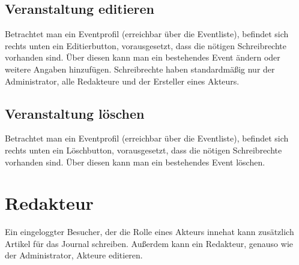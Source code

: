 \documentclass{swp}
\begin{document}
\subsection{Veranstaltung editieren}
Betrachtet man ein Eventprofil (erreichbar über die Eventliste), befindet sich rechts unten ein Editierbutton, vorausgesetzt, dass die n\"otigen Schreibrechte vorhanden sind. \"Uber diesen kann man ein bestehendes Event \"andern oder weitere Angaben hinzuf\"ugen.
Schreibrechte haben standardm\"a{\ss}ig nur der Administrator, alle Redakteure und der Ersteller eines Akteurs.
\subsection{Veranstaltung l\"oschen}
Betrachtet man ein Eventprofil (erreichbar über die Eventliste), befindet sich rechts unten ein L\"oschbutton, vorausgesetzt, dass die n\"otigen Schreibrechte vorhanden sind. \"Uber diesen kann man ein bestehendes Event l\"oschen.

\section{Redakteur}
Ein eingeloggter Besucher, der die Rolle eines Akteurs innehat kann zus\"atzlich Artikel für das Journal schreiben. Au{\ss}erdem kann ein Redakteur, genauso wie der Administrator, Akteure editieren.
\end{document}
